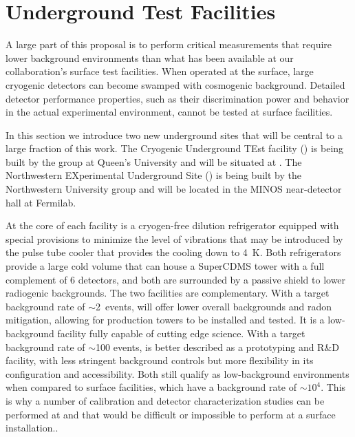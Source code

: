 \section{Underground Test Facilities}
\label{sec:nexuscute}

A large part of this proposal is to perform critical measurements that require lower background environments than what has been available at our collaboration's surface test facilities. When operated at the surface, large cryogenic detectors can become swamped with cosmogenic background. Detailed detector performance properties, such as their discrimination power and behavior in the actual experimental environment, cannot be tested at surface facilities.

In this section we introduce two new underground sites that will be central to a large fraction of this work. The Cryogenic Underground TEst facility (\cute) is being built by the \SuperCDMS group at Queen's University and will be situated at \SNOLAB. The Northwestern EXperimental Underground Site (\nexus) is being built by the Northwestern University group and will be located in the MINOS near-detector hall at Fermilab. 

At the core of each facility is a cryogen-free dilution refrigerator equipped with special provisions to minimize the level of vibrations that may be introduced by the pulse tube cooler that provides the cooling down to 4~K. Both refrigerators provide a large cold volume that can house a SuperCDMS tower with a full complement of 6 detectors, and both are surrounded by a passive shield to lower radiogenic backgrounds. The two facilities are complementary. With a target background rate of $\sim$2~events\perkkd, \cute will offer lower overall backgrounds and radon mitigation, allowing for production \scs towers to be installed and tested. It is a low-background facility fully capable of cutting edge science. With a target background rate of $\sim$100 events\perkkd, \nexus is better described as a prototyping and R\&D facility, with less stringent background controls but more flexibility in its configuration and accessibility. Both still qualify as low-background environments when compared to surface facilities, which have a background rate of $\sim 10^4$\perkkd. This is why a number of calibration and detector characterization studies can be performed at \nexus and \cute that would be difficult or impossible to perform at a surface installation..

